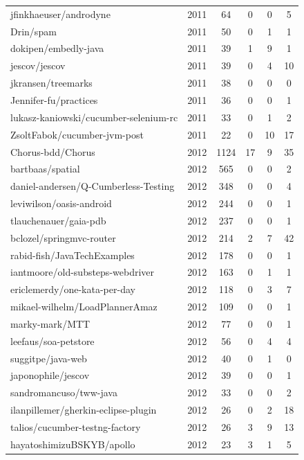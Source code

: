 \begin{table}
\begin{tabular}{p{6cm} c c c c c}
jfinkhaeuser/androdyne & 2011 & 64 & 0 & 0 & 5 \\
Drin/spam & 2011 & 50 & 0 & 1 & 1 \\
dokipen/embedly-java & 2011 & 39 & 1 & 9 & 1 \\
jescov/jescov & 2011 & 39 & 0 & 4 & 10 \\
jkransen/treemarks & 2011 & 38 & 0 & 0 & 0 \\
Jennifer-fu/practices & 2011 & 36 & 0 & 0 & 1 \\
lukasz-kaniowski/cucumber-selenium-rc & 2011 & 33 & 0 & 1 & 2 \\
ZsoltFabok/cucumber-jvm-post & 2011 & 22 & 0 & 10 & 17 \\
Chorus-bdd/Chorus & 2012 & 1124 & 17 & 9 & 35 \\
bartbaas/spatial & 2012 & 565 & 0 & 0 & 2 \\
daniel-andersen/Q-Cumberless-Testing & 2012 & 348 & 0 & 0 & 4 \\
leviwilson/oasis-android & 2012 & 244 & 0 & 0 & 1 \\
tlauchenauer/gaia-pdb & 2012 & 237 & 0 & 0 & 1 \\
bclozel/springmvc-router & 2012 & 214 & 2 & 7 & 42 \\
rabid-fish/JavaTechExamples & 2012 & 178 & 0 & 0 & 1 \\
iantmoore/old-substeps-webdriver & 2012 & 163 & 0 & 1 & 1 \\
ericlemerdy/one-kata-per-day & 2012 & 118 & 0 & 3 & 7 \\
mikael-wilhelm/LoadPlannerAmaz & 2012 & 109 & 0 & 0 & 1 \\
marky-mark/MTT & 2012 & 77 & 0 & 0 & 1 \\
leefaus/soa-petstore & 2012 & 56 & 0 & 4 & 4 \\
suggitpe/java-web & 2012 & 40 & 0 & 1 & 0 \\
japonophile/jescov & 2012 & 39 & 0 & 0 & 1 \\
sandromancuso/tww-java & 2012 & 33 & 0 & 0 & 2 \\
ilanpillemer/gherkin-eclipse-plugin & 2012 & 26 & 0 & 2 & 18 \\
talios/cucumber-testng-factory & 2012 & 26 & 3 & 9 & 13 \\
hayatoshimizuBSKYB/apollo & 2012 & 23 & 3 & 1 & 5

	\end{tabular}
\end{table}

